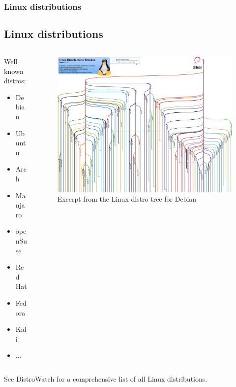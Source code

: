 \begin{frame}
	\frametitle{Linux distributions}
	\subsection{Linux distributions}
	
	\begin{columns}
		\begin{column}{.25\linewidth}
			Well known distros:
			\begin{itemize}
				\item Debian
				\item Ubuntu
				\item Arch
				\item Manjaro
				\item openSuse
				\item Red Hat
				\item Fedora
				\item Kali
				\item $\dots$
			\end{itemize}
		\end{column}
		\hfill
		\begin{column}{.7\linewidth}
			\begin{figure}
				\includegraphics[width=\linewidth]{../graphics/debian_distro_timeline/debian_distro_timeline.png}
				\caption{Excerpt from the Linux distro tree for Debian \cite{distrograph}}
			\end{figure}
		\end{column}
	\end{columns}
	
	\vfill
	
	\centering
	See DistroWatch\cite{distrowatch} for a comprehensive list of all Linux distributions.
\end{frame}

